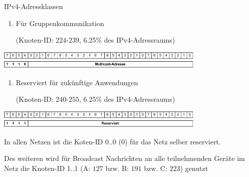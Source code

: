 \begin{defi}{IPv4-Adressklassen}
    \begin{enumerate}[label=Class \Alph*:, leftmargin=*, start=4]
        \item Für Gruppenkommunikation

              (Knoten-ID: $224\text{-}239$, 6.25\% des IPv4-Adressraums)
    \end{enumerate}

    \begin{center}
        \includegraphics[width=0.75\textwidth]{includes/figures/bonus_class_d.pdf}
    \end{center}

    \begin{enumerate}[label=Class \Alph*:, leftmargin=*, start=5]
        \item Reserviert für zukünftige Anwendungen

              (Knoten-ID: $240\text{-}255$, 6.25\% des IPv4-Adressraums)
    \end{enumerate}

    \begin{center}
        \includegraphics[width=0.75\textwidth]{includes/figures/bonus_class_e.pdf}
    \end{center}

    In allen Netzen ist die Koten-ID 0..0 ($0$) für das Netz selber reserviert.

    Des weiteren wird für Broadcast Nachrichten an alle teilnehmenden Geräte im Netz die Knoten-ID 1..1 ($\text{A: } 127 \text{ bzw. B: } 191 \text{ bzw. C: } 223$) genutzt
\end{defi}

